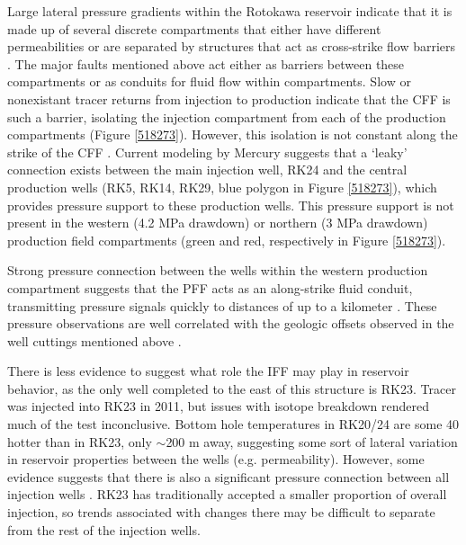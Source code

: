 Large lateral pressure gradients within the Rotokawa reservoir indicate that it is made up of several discrete compartments that either have different permeabilities or are separated by structures that act as cross-strike flow barriers \citep{Quinao_2013stanford,Sewell_2015}. The major faults mentioned above act either as barriers between these compartments or as conduits for fluid flow within compartments. Slow or nonexistant tracer returns from injection to production indicate that the \acrshort{CFF} is such a barrier, isolating the injection compartment from each of the production compartments (Figure \ref{518273}). However, this isolation is not constant along the strike of the \acrshort{CFF} \citep{Addison_2017stanford}. Current modeling by Mercury suggests that a `leaky' connection exists between the main injection well, RK24 and the central production wells (RK5, RK14, RK29, blue polygon in Figure \ref{518273}), which provides pressure support to these production wells. This pressure support is not present in the western (4.2 MPa drawdown) or northern (3 MPa drawdown) production field compartments \citep{Quinao_2013stanford,Addison_2017stanford} (green and red, respectively in Figure \ref{518273}).

Strong pressure connection between the wells within the western production compartment suggests that the \acrshort{PFF} acts as an along-strike fluid conduit, transmitting pressure signals quickly to distances of up to a kilometer \citep{Quinao_2013stanford,Sewell_2015,McNamara_2016}. These pressure observations are well correlated with the geologic offsets observed in the well cuttings mentioned above \citep{wallis2013}.

There is less evidence to suggest what role the \acrshort{IFF} may play in reservoir behavior, as the only well completed to the east of this structure is RK23. Tracer was injected into RK23 in 2011, but issues with isotope breakdown rendered much of the test inconclusive. Bottom hole temperatures in RK20\slash24 are some 40 hotter than in RK23, only $\sim$200 m away, suggesting some sort of lateral variation in reservoir properties between the wells (e.g. \gls{permeability}). However, some evidence suggests that there is also a significant pressure connection between all injection wells \citep{Quinao_2013stanford}. RK23 has traditionally accepted a smaller proportion of overall injection, so trends associated with changes there may be difficult to separate from the rest of the injection wells.

